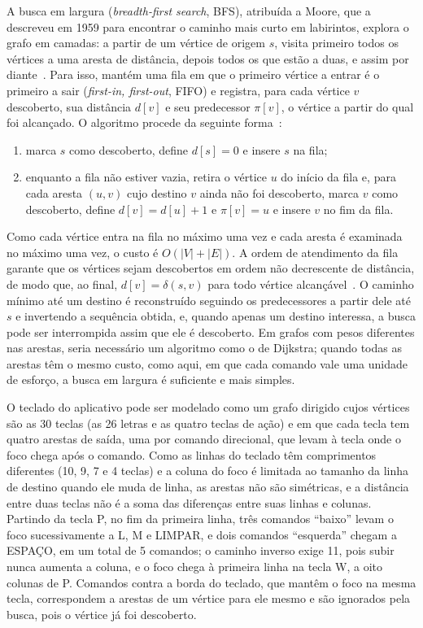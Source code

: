 A busca em largura (\textit{breadth-first search}, BFS), atribuída a Moore, que a descreveu em 1959 para encontrar o caminho mais curto em labirintos, explora o grafo em camadas: a partir de um vértice de origem $s$, visita primeiro todos os vértices a uma aresta de distância, depois todos os que estão a duas, e assim por diante~\cite[seç.~8.4]{erickson2019algorithms}. Para isso, mantém uma fila em que o primeiro vértice a entrar é o primeiro a sair (\textit{first-in, first-out}, FIFO) e registra, para cada vértice $v$ descoberto, sua distância $d[v]$ e seu predecessor $\pi[v]$, o vértice a partir do qual foi alcançado. O algoritmo procede da seguinte forma~\cite[seç.~8.4]{erickson2019algorithms}:
\begin{enumerate}
    \item marca $s$ como descoberto, define $d[s] = 0$ e insere $s$ na fila;
    \item enquanto a fila não estiver vazia, retira o vértice $u$ do início da fila e, para cada aresta $(u, v)$ cujo destino $v$ ainda não foi descoberto, marca $v$ como descoberto, define $d[v] = d[u] + 1$ e $\pi[v] = u$ e insere $v$ no fim da fila.
\end{enumerate}
Como cada vértice entra na fila no máximo uma vez e cada aresta é examinada no máximo uma vez, o custo é $O(|V| + |E|)$. A ordem de atendimento da fila garante que os vértices sejam descobertos em ordem não decrescente de distância, de modo que, ao final, $d[v] = \delta(s, v)$ para todo vértice alcançável~\cite[seç.~8.4]{erickson2019algorithms}. O caminho mínimo até um destino é reconstruído seguindo os predecessores a partir dele até $s$ e invertendo a sequência obtida, e, quando apenas um destino interessa, a busca pode ser interrompida assim que ele é descoberto. Em grafos com pesos diferentes nas arestas, seria necessário um algoritmo como o de Dijkstra; quando todas as arestas têm o mesmo custo, como aqui, em que cada comando vale uma unidade de esforço, a busca em largura é suficiente e mais simples.

O teclado do aplicativo pode ser modelado como um grafo dirigido cujos vértices são as 30 teclas (as 26 letras e as quatro teclas de ação) e em que cada tecla tem quatro arestas de saída, uma por comando direcional, que levam à tecla onde o foco chega após o comando. Como as linhas do teclado têm comprimentos diferentes (10, 9, 7 e 4 teclas) e a coluna do foco é limitada ao tamanho da linha de destino quando ele muda de linha, as arestas não são simétricas, e a distância entre duas teclas não é a soma das diferenças entre suas linhas e colunas. Partindo da tecla P, no fim da primeira linha, três comandos ``baixo'' levam o foco sucessivamente a L, M e LIMPAR, e dois comandos ``esquerda'' chegam a ESPAÇO, em um total de 5 comandos; o caminho inverso exige 11, pois subir nunca aumenta a coluna, e o foco chega à primeira linha na tecla W, a oito colunas de P. Comandos contra a borda do teclado, que mantêm o foco na mesma tecla, correspondem a arestas de um vértice para ele mesmo e são ignorados pela busca, pois o vértice já foi descoberto.

